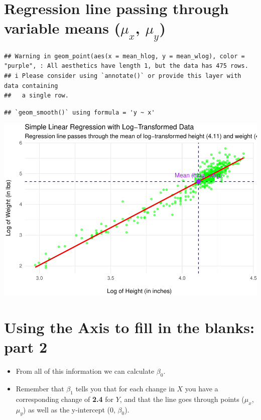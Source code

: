 \documentclass[
]{article}
\begin{document}
\hypertarget{regression-line-passing-through-variable-means-mu_x-mu_y}{%
\section{\texorpdfstring{Regression line passing through variable means
(\(\mu_x\),
\(\mu_y\))}{Regression line passing through variable means (\textbackslash mu\_x, \textbackslash mu\_y)}}\label{regression-line-passing-through-variable-means-mu_x-mu_y}}

\begin{verbatim}
## Warning in geom_point(aes(x = mean_hlog, y = mean_wlog), color = "purple", : All aesthetics have length 1, but the data has 475 rows.
## i Please consider using `annotate()` or provide this layer with data containing
##   a single row.
\end{verbatim}

\begin{verbatim}
## `geom_smooth()` using formula = 'y ~ x'
\end{verbatim}

\includegraphics{L7_Correlation_and_regression_pdf_files/figure-latex/unnamed-chunk-6-1.pdf}

\hypertarget{using-the-axis-to-fill-in-the-blanks-part-2}{%
\section{Using the Axis to fill in the blanks: part
2}\label{using-the-axis-to-fill-in-the-blanks-part-2}}

\begin{itemize}
\item
  From all of this information we can calculate \(\beta_0\).
\item
  Remember that \(\beta_1\) tells you that for each change in \(X\) you
  have a corresponding change of \textbf{2.4} for \(Y\), and that the
  line goes through points (\(\mu_x\), \(\mu_y\)) as well as the
  y-intercept (0, \(\beta_0\)).
\end{itemize}
\end{document}
